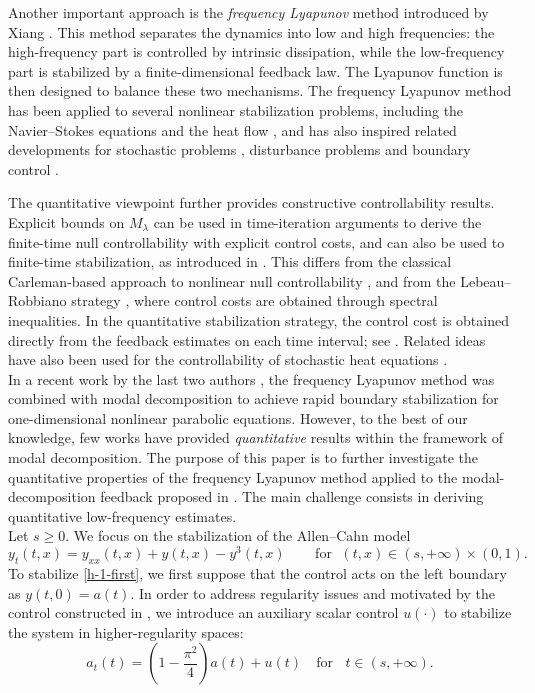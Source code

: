 \documentclass[a4paper]{article}
\numberwithin{equation}{section}
\begin{document}
Another important approach is the \textit{frequency Lyapunov} method introduced by Xiang \cite{X}. This method separates the dynamics into low and high frequencies: the high-frequency part is controlled by intrinsic dissipation, while the low-frequency part is stabilized by a finite-dimensional feedback law. The Lyapunov function is then designed to balance these two mechanisms. The frequency Lyapunov method has been applied to several nonlinear stabilization problems, including the Navier--Stokes equations \cite{X1} and the heat flow \cite{CX1}, and has also inspired related developments for stochastic problems \cite{HLP}, disturbance problems \cite{GPC} and boundary control \cite{XZ}.
\vspace{1mm}

The quantitative viewpoint further provides constructive controllability results. Explicit bounds on $M_\lambda$ can be used in time-iteration arguments to derive the finite-time null controllability with explicit control costs, and can also be used to finite-time stabilization, as introduced in \cite{CN}. This differs from the classical Carleman-based approach to nonlinear null controllability \cite{PWZ}, and from the Lebeau--Robbiano strategy \cite{LR,M}, where control costs are obtained through spectral inequalities. In the quantitative stabilization strategy, the control cost is obtained directly from the feedback estimates on each time interval; see \cite{X2,X1,X}. Related ideas have also been used for the controllability of stochastic heat equations \cite{HLP}.
\\[-2mm]

In a recent work by the last two authors \cite{XZ}, the frequency Lyapunov method was combined with modal decomposition to achieve rapid boundary stabilization for one-dimensional nonlinear parabolic equations. However, to the best of our knowledge, few works have provided \textit{quantitative} results within the framework of modal decomposition. The purpose of this paper is to further investigate the quantitative properties of the frequency Lyapunov method applied to the modal-decomposition feedback proposed in \cite{XZ}. The main challenge consists in deriving quantitative low-frequency estimates.\\[-2mm]

Let $s\ge 0$. We focus on the stabilization of the Allen--Cahn model
\begin{equation}\label{h-1-first}
y_t(t,x)=y_{xx}(t,x)+y(t,x)-y^3(t,x)\;\;\;\; \quad\text{for }\;(t,x)\in (s,+\infty)\times (0,1).
\end{equation}
To stabilize \eqref{h-1-first}, we first suppose that the control acts on the left boundary as $y(t,0)=a(t)$. In order to address regularity issues and motivated by the control constructed in \cite{X2,XZ}, we introduce an auxiliary scalar control $u(\cdot)$ to stabilize the system in higher-regularity spaces:
\begin{equation}\label{a67}
a_t(t)=(1-\frac{\pi^2}{4})a(t)+u(t)\quad\text{for }\;\;t\in(s,+\infty).
\end{equation}
\end{document}
